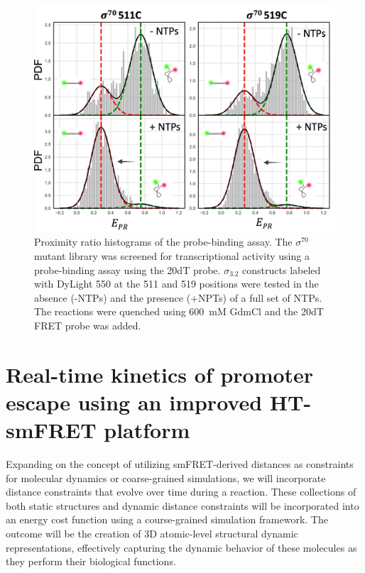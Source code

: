 \begin{figure}
    \centering
    \includegraphics[width=\textwidth]{chapters/figures/mutant_screening_hists.jpg}
    \caption{\label{fig:mutant_screening} 
    Proximity ratio histograms of the probe-binding assay. 
    The $\sigma^{70}$ mutant library was screened for transcriptional activity using a probe-binding assay using the 20dT probe. 
    $\sigma_{3.2}$ constructs labeled with DyLight 550 at the 511 and 519 positions were tested in the absence (-NTPs) and the presence (+NPTs) of a full set of NTPs.
    The reactions were quenched using 600~mM GdmCl and the 20dT FRET probe was added.
    }
\end{figure}


\section{Real-time kinetics of promoter escape using an improved HT-smFRET platform}
\label{sec:HT-smFRET_of_txn_exp}

Expanding on the concept of utilizing \ac{smFRET}-derived distances as constraints for molecular dynamics or coarse-grained simulations, we will incorporate distance constraints that evolve over time during a reaction.
These collections of both static structures and dynamic distance constraints will be incorporated into an energy cost function using a course-grained simulation framework. 
The outcome will be the creation of 3D atomic-level structural dynamic representations, effectively capturing the dynamic behavior of these molecules as they perform their biological functions.

